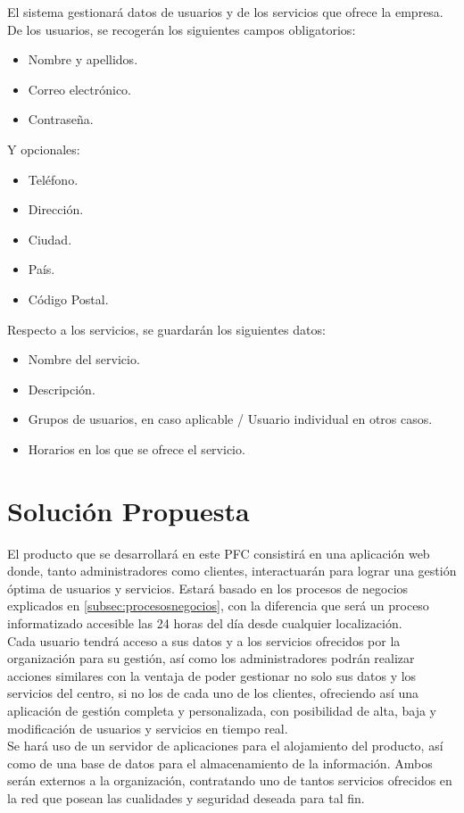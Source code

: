 El sistema gestionará datos de usuarios y de los servicios que ofrece la empresa. 
\\
De los usuarios, se recogerán los siguientes campos obligatorios: 

\begin{itemize}
\item Nombre y apellidos.
\item Correo electrónico.
\item Contraseña.
\end{itemize}

Y opcionales:

\begin{itemize}
\item Teléfono.
\item Dirección.
\item Ciudad.
\item País.
\item Código Postal.
\end{itemize}

Respecto a los servicios, se guardarán los siguientes datos: 

\begin{itemize}
\item Nombre del servicio.
\item Descripción.
\item Grupos de usuarios, en caso aplicable / Usuario individual en otros casos.
\item Horarios en los que se ofrece el servicio.
\end{itemize}



\section{Solución Propuesta}

El producto que se desarrollará en este PFC consistirá en una aplicación web donde, tanto administradores como clientes, interactuarán para lograr una gestión óptima de usuarios y servicios. Estará basado en los procesos de negocios explicados en \ref{subsec:procesosnegocios}, con la diferencia que será un proceso informatizado accesible las 24 horas del día desde cualquier localización. 
\\

Cada usuario tendrá acceso a sus datos y a los servicios ofrecidos por la organización para su gestión, así como los administradores podrán realizar acciones similares con la ventaja de poder gestionar no solo sus datos y los servicios del centro, si no los de cada uno de los clientes, ofreciendo así una aplicación de gestión completa y personalizada, con posibilidad de alta, baja y modificación de usuarios y servicios en tiempo real.
\\

Se hará uso de un servidor de aplicaciones para el alojamiento del producto, así como de una base de datos para el almacenamiento de la información. Ambos serán externos a la organización, contratando uno de tantos servicios ofrecidos en la red que posean las cualidades y seguridad deseada para tal fin. 

